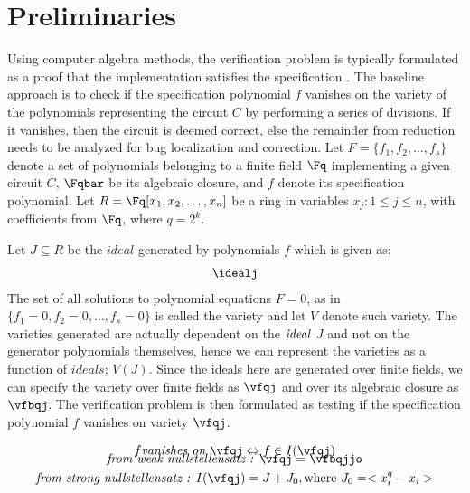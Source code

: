 \section{Preliminaries}
Using computer algebra methods, the verification problem is typically formulated as a proof that the implementation satisfies the specification \cite{tim}\cite{lv}\cite{shekhar:tcad07}. The baseline approach is to check if the specification polynomial $f$ vanishes on the variety of the polynomials representing the circuit $C$ by performing a series of divisions. If it vanishes, then the circuit is deemed correct, else the remainder from reduction needs to be analyzed for bug localization and correction. Let $F=\{f_1,f_2,\dots,f_s\}$ denote a set of polynomials belonging to a finite field $\Fq$ implementing a given circuit $C$, $\Fqbar$ be its algebraic closure, and $f$ denote its specification polynomial. Let $R = \Fq[x_1,x_2,\dots,x_n]$ be a ring in variables $x_j : 1\le j\le n$, with coefficients from $\Fq$, where $q=2^k$.

Let $J\subseteq R$ be the $ideal$ generated by polynomials $f$ which is given as:
\begin{align}
\idealj
\end{align}
The set of all solutions to polynomial equations $F=0$, as in $\{f_1=0,f_2=0,\dots,f_s=0\}$ is called the variety and let $V$ denote such variety. The varieties generated are actually dependent on the $\it{ideal}$ $J$ and not on the generator polynomials themselves, hence we can represent the varieties as a function of $ideals$; $V(J)$. Since the ideals here are generated over finite fields, we can specify the variety over finite fields as $\vfqj$ and over its algebraic closure as $\vfbqj$. The verification problem is then formulated as testing if the specification polynomial $f$ vanishes on variety $\vfqj$. 

\begin{gather*}
\vspace{-2ex}
    f \textit{vanishes on } \vfqj \Leftrightarrow f \in I(\vfqj)\\
    \textit{from weak nullstellensatz : } \vfqj = \vfbqjjo \\
    \textit{from strong nullstellensatz : } I(\vfqj) = J + J_0, \text{where } J_0 = <x_i^q-x_i>
\end{gather*}

